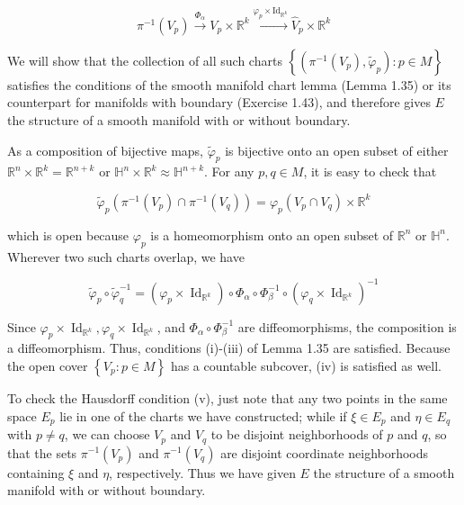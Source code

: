 \documentclass[10pt]{article}
\begin{document}
$$
\pi^{-1}\left(V_{p}\right) \xrightarrow{\Phi_{\alpha}} V_{p} \times \mathbb{R}^{k} \xrightarrow{\varphi_{p} \times \mathrm{Id}_{\mathbb{R}^{k}}} \widehat{V}_{p} \times \mathbb{R}^{k}
$$

We will show that the collection of all such charts $\left\{\left(\pi^{-1}\left(V_{p}\right), \widetilde{\varphi}_{p}\right): p \in M\right\}$ satisfies the conditions of the smooth manifold chart lemma (Lemma 1.35) or its counterpart for manifolds with boundary (Exercise 1.43), and therefore gives $E$ the structure of a smooth manifold with or without boundary.

As a composition of bijective maps, $\widetilde{\varphi}_{p}$ is bijective onto an open subset of either $\mathbb{R}^{n} \times \mathbb{R}^{k}=\mathbb{R}^{n+k}$ or $\mathbb{H}^{n} \times \mathbb{R}^{k} \approx \mathbb{H}^{n+k}$. For any $p, q \in M$, it is easy to check that

$$
\widetilde{\varphi}_{p}\left(\pi^{-1}\left(V_{p}\right) \cap \pi^{-1}\left(V_{q}\right)\right)=\varphi_{p}\left(V_{p} \cap V_{q}\right) \times \mathbb{R}^{k}
$$

which is open because $\varphi_{p}$ is a homeomorphism onto an open subset of $\mathbb{R}^{n}$ or $\mathbb{H}^{n}$. Wherever two such charts overlap, we have

$$
\widetilde{\varphi}_{p} \circ \widetilde{\varphi}_{q}^{-1}=\left(\varphi_{p} \times \operatorname{Id}_{\mathbb{R}^{k}}\right) \circ \Phi_{\alpha} \circ \Phi_{\beta}^{-1} \circ\left(\varphi_{q} \times \operatorname{Id}_{\mathbb{R}^{k}}\right)^{-1}
$$

Since $\varphi_{p} \times \operatorname{Id}_{\mathbb{R}^{k}}, \varphi_{q} \times \operatorname{Id}_{\mathbb{R}^{k}}$, and $\Phi_{\alpha} \circ \Phi_{\beta}^{-1}$ are diffeomorphisms, the composition is a diffeomorphism. Thus, conditions (i)-(iii) of Lemma 1.35 are satisfied. Because the open cover $\left\{V_{p}: p \in M\right\}$ has a countable subcover, (iv) is satisfied as well.

To check the Hausdorff condition (v), just note that any two points in the same space $E_{p}$ lie in one of the charts we have constructed; while if $\xi \in E_{p}$ and $\eta \in E_{q}$ with $p \neq q$, we can choose $V_{p}$ and $V_{q}$ to be disjoint neighborhoods of $p$ and $q$, so that the sets $\pi^{-1}\left(V_{p}\right)$ and $\pi^{-1}\left(V_{q}\right)$ are disjoint coordinate neighborhoods containing $\xi$ and $\eta$, respectively. Thus we have given $E$ the structure of a smooth manifold with or without boundary.
\end{document}
